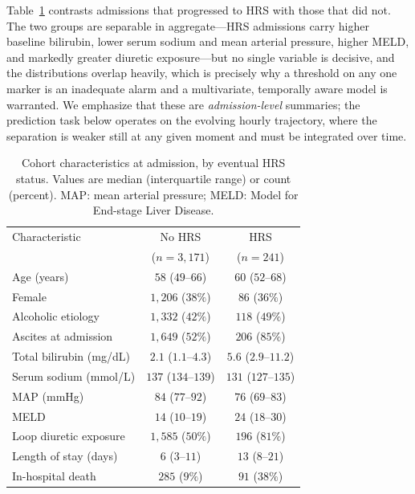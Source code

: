 \documentclass{article}
\begin{document}
Table~\ref{tab:cohort} contrasts admissions that progressed to HRS with those that
did not. The two groups are separable in aggregate---HRS admissions carry higher
baseline bilirubin, lower serum sodium and mean arterial pressure, higher MELD, and
markedly greater diuretic exposure---but no single variable is decisive, and the
distributions overlap heavily, which is precisely why a threshold on any one marker
is an inadequate alarm and a multivariate, temporally aware model is warranted. We
emphasize that these are \emph{admission-level} summaries; the prediction task below
operates on the evolving hourly trajectory, where the separation is weaker still at
any given moment and must be integrated over time.

\begin{table}[t]
\caption{Cohort characteristics at admission, by eventual HRS status. Values are
median (interquartile range) or count (percent). MAP: mean arterial pressure;
MELD: Model for End-stage Liver Disease.}
\label{tab:cohort}
\centering
\small
\begin{tabular}{lcc}
\toprule
Characteristic & No HRS & HRS \\
 & ($n=3{,}171$) & ($n=241$) \\
\midrule
Age (years)              & $58$ ($49$--$66$) & $60$ ($52$--$68$) \\
Female                   & $1{,}206$ ($38\%$) & $86$ ($36\%$) \\
Alcoholic etiology       & $1{,}332$ ($42\%$) & $118$ ($49\%$) \\
Ascites at admission     & $1{,}649$ ($52\%$) & $206$ ($85\%$) \\
Total bilirubin (mg/dL)  & $2.1$ ($1.1$--$4.3$) & $5.6$ ($2.9$--$11.2$) \\
Serum sodium (mmol/L)    & $137$ ($134$--$139$) & $131$ ($127$--$135$) \\
MAP (mmHg)               & $84$ ($77$--$92$) & $76$ ($69$--$83$) \\
MELD                     & $14$ ($10$--$19$) & $24$ ($18$--$30$) \\
Loop diuretic exposure   & $1{,}585$ ($50\%$) & $196$ ($81\%$) \\
Length of stay (days)    & $6$ ($3$--$11$) & $13$ ($8$--$21$) \\
In-hospital death        & $285$ ($9\%$) & $91$ ($38\%$) \\
\bottomrule
\end{tabular}
\end{table}
\end{document}
